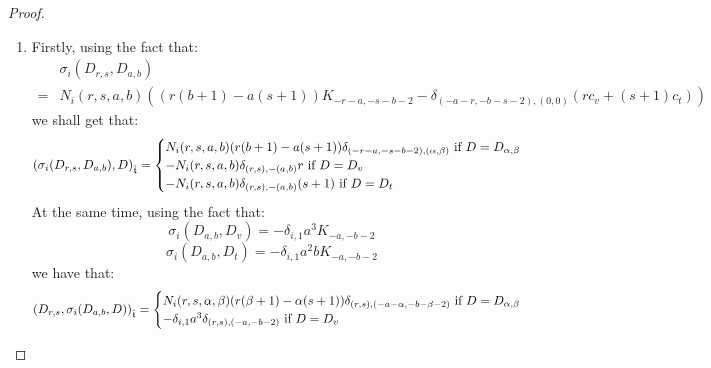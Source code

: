             \begin{proof}
                \begin{enumerate}
                    \item Firstly, using the fact that:
                        $$
                            \begin{aligned}
                                & \sigma_i(D_{r, s}, D_{a, b})
                                \\
                                = & N_i(r, s, a, b) \left( ( r(b + 1) - a(s + 1) )K_{-r - a, -s - b - 2} - \delta_{ (-a - r, -b - s - 2), (0, 0) } (r c_v + (s + 1) c_t) \right)
                            \end{aligned}
                        $$
                    we shall get that:
                        $$
                            \left( \sigma_i(D_{r, s}, D_{a, b}), D \right)_{\extendedtoroidal} =
                            \begin{cases}
                                \text{$N_i(r, s, a, b) ( r(b + 1) - a(s + 1) ) \delta_{(-r - a, -s - b - 2), (\alpha, \beta)}$ if $D = D_{\alpha, \beta}$}
                                \\
                                \text{$-N_i(r, s, a, b) \delta_{(r, s), -(a, b)} r$ if $D = D_v$}
                                \\
                                \text{$-N_i(r, s, a, b) \delta_{(r, s), -(a, b)} (s + 1)$ if $D = D_t$}
                            \end{cases}
                        $$
                    At the same time, using the fact that:
                        $$\sigma_i(D_{a, b}, D_v) = -\delta_{i, 1} a^3 K_{-a, -b - 2}$$
                        $$\sigma_i(D_{a, b}, D_t) = - \delta_{i, 1} a^2b K_{-a, -b - 2}$$
                    we have that:
                        $$
                            \begin{aligned}
                                \left( D_{r, s}, \sigma_i(D_{a, b}, D) \right)_{\extendedtoroidal} =
                                \begin{cases}
                                    \text{$N_i(r, s, \alpha, \beta) ( r(\beta + 1) - \alpha(s + 1) ) \delta_{(r, s), (-a - \alpha, -b - \beta - 2)}$ if $D = D_{\alpha, \beta}$}
                                    \\
                                    \text{$-\delta_{i, 1} a^3 \delta_{(r, s), (-a, -b - 2)}$ if $D = D_v$}
                                    \\

\end{cases}
\end{aligned}$$
\end{enumerate}
\end{proof}
